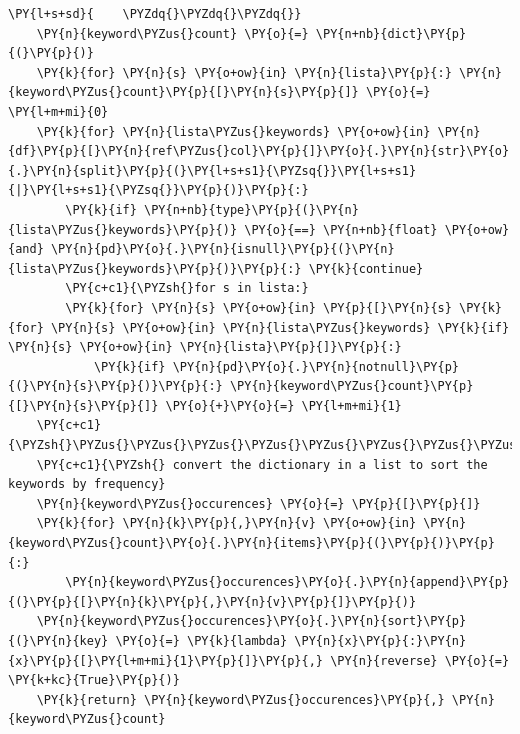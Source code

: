 \begin{tcolorbox}[breakable, size=fbox, boxrule=1pt, pad at break*=1mm,colback=cellbackground, colframe=cellborder]
\begin{Verbatim}[commandchars=\\\{\}]
\PY{l+s+sd}{    \PYZdq{}\PYZdq{}\PYZdq{}}
    \PY{n}{keyword\PYZus{}count} \PY{o}{=} \PY{n+nb}{dict}\PY{p}{(}\PY{p}{)}
    \PY{k}{for} \PY{n}{s} \PY{o+ow}{in} \PY{n}{lista}\PY{p}{:} \PY{n}{keyword\PYZus{}count}\PY{p}{[}\PY{n}{s}\PY{p}{]} \PY{o}{=} \PY{l+m+mi}{0}
    \PY{k}{for} \PY{n}{lista\PYZus{}keywords} \PY{o+ow}{in} \PY{n}{df}\PY{p}{[}\PY{n}{ref\PYZus{}col}\PY{p}{]}\PY{o}{.}\PY{n}{str}\PY{o}{.}\PY{n}{split}\PY{p}{(}\PY{l+s+s1}{\PYZsq{}}\PY{l+s+s1}{|}\PY{l+s+s1}{\PYZsq{}}\PY{p}{)}\PY{p}{:}
        \PY{k}{if} \PY{n+nb}{type}\PY{p}{(}\PY{n}{lista\PYZus{}keywords}\PY{p}{)} \PY{o}{==} \PY{n+nb}{float} \PY{o+ow}{and} \PY{n}{pd}\PY{o}{.}\PY{n}{isnull}\PY{p}{(}\PY{n}{lista\PYZus{}keywords}\PY{p}{)}\PY{p}{:} \PY{k}{continue}
        \PY{c+c1}{\PYZsh{}for s in lista:}
        \PY{k}{for} \PY{n}{s} \PY{o+ow}{in} \PY{p}{[}\PY{n}{s} \PY{k}{for} \PY{n}{s} \PY{o+ow}{in} \PY{n}{lista\PYZus{}keywords} \PY{k}{if} \PY{n}{s} \PY{o+ow}{in} \PY{n}{lista}\PY{p}{]}\PY{p}{:}
            \PY{k}{if} \PY{n}{pd}\PY{o}{.}\PY{n}{notnull}\PY{p}{(}\PY{n}{s}\PY{p}{)}\PY{p}{:} \PY{n}{keyword\PYZus{}count}\PY{p}{[}\PY{n}{s}\PY{p}{]} \PY{o}{+}\PY{o}{=} \PY{l+m+mi}{1}
    \PY{c+c1}{\PYZsh{}\PYZus{}\PYZus{}\PYZus{}\PYZus{}\PYZus{}\PYZus{}\PYZus{}\PYZus{}\PYZus{}\PYZus{}\PYZus{}\PYZus{}\PYZus{}\PYZus{}\PYZus{}\PYZus{}\PYZus{}\PYZus{}\PYZus{}\PYZus{}\PYZus{}\PYZus{}\PYZus{}\PYZus{}\PYZus{}\PYZus{}\PYZus{}\PYZus{}\PYZus{}\PYZus{}\PYZus{}\PYZus{}\PYZus{}\PYZus{}\PYZus{}\PYZus{}\PYZus{}\PYZus{}\PYZus{}\PYZus{}\PYZus{}\PYZus{}\PYZus{}\PYZus{}\PYZus{}\PYZus{}\PYZus{}\PYZus{}\PYZus{}\PYZus{}\PYZus{}\PYZus{}\PYZus{}\PYZus{}\PYZus{}\PYZus{}\PYZus{}\PYZus{}\PYZus{}\PYZus{}\PYZus{}\PYZus{}\PYZus{}\PYZus{}\PYZus{}\PYZus{}\PYZus{}\PYZus{}\PYZus{}\PYZus{}}
    \PY{c+c1}{\PYZsh{} convert the dictionary in a list to sort the keywords by frequency}
    \PY{n}{keyword\PYZus{}occurences} \PY{o}{=} \PY{p}{[}\PY{p}{]}
    \PY{k}{for} \PY{n}{k}\PY{p}{,}\PY{n}{v} \PY{o+ow}{in} \PY{n}{keyword\PYZus{}count}\PY{o}{.}\PY{n}{items}\PY{p}{(}\PY{p}{)}\PY{p}{:}
        \PY{n}{keyword\PYZus{}occurences}\PY{o}{.}\PY{n}{append}\PY{p}{(}\PY{p}{[}\PY{n}{k}\PY{p}{,}\PY{n}{v}\PY{p}{]}\PY{p}{)}
    \PY{n}{keyword\PYZus{}occurences}\PY{o}{.}\PY{n}{sort}\PY{p}{(}\PY{n}{key} \PY{o}{=} \PY{k}{lambda} \PY{n}{x}\PY{p}{:}\PY{n}{x}\PY{p}{[}\PY{l+m+mi}{1}\PY{p}{]}\PY{p}{,} \PY{n}{reverse} \PY{o}{=} \PY{k+kc}{True}\PY{p}{)}
    \PY{k}{return} \PY{n}{keyword\PYZus{}occurences}\PY{p}{,} \PY{n}{keyword\PYZus{}count}
\end{Verbatim}
\end{tcolorbox}

